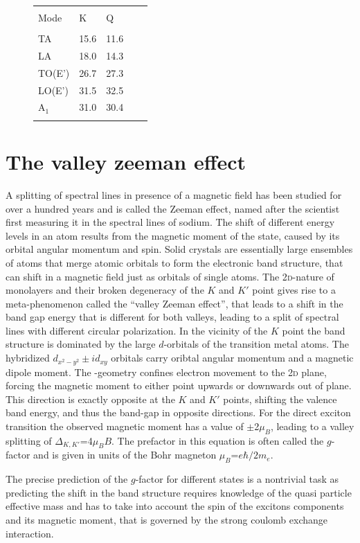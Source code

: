 \begin{figure}[t]
\centering
\begin{tabular}{lllll}
\hline
\hline\\
Mode&K&Q\\
\hline\\
TA&15.6&11.6\\
LA&18.0&14.3\\
TO(E')&26.7&27.3\\
LO(E')&31.5&32.5\\
A$_1$&31.0&30.4\\
\\\hline


\end{tabular}
\caption{\cite{jin_intrinsic_2014}}\label{phonons}
\end{figure}
\cite{van_der_donck_excitons_2018} 

\section{The valley zeeman effect}\label{zeeman}

A splitting of spectral lines in presence of a magnetic field has been studied for over a hundred years and is called the Zeeman effect, named after the scientist first measuring it in the spectral lines of sodium. The shift of different energy levels in an atom results from the magnetic moment of the state, caused by its orbital angular momentum and spin. Solid crystals are essentially large ensembles of atoms that merge atomic orbitals to form the electronic band structure, that can shift in a magnetic field just as orbitals of single atoms. The 2\textsc{d}-nature of \tmdg monolayers and their broken degeneracy of the $K$ and $K'$ point gives rise to a meta-phenomenon called  the ``valley Zeeman effect'', that leads to a shift in the band gap energy that is different for both valleys, leading to a split of spectral lines with different circular polarization\cite{srivastava_valley_2015}. In the vicinity of the $K$ point the band structure is dominated by the large $d$-orbitals of the transition metal atoms. The hybridized $d_{x^2-y^2} \pm id_{xy}$ orbitals carry oribtal angular momentum and a magnetic dipole moment. The \tmd-geometry confines electron movement to the 2\textsc{d} plane, forcing the magnetic moment to either point upwards or downwards out of plane. This direction is exactly opposite at the $K$ and $K'$ points, shifting the valence band energy, and thus the band-gap in opposite directions. For the direct exciton transition the observed magnetic moment has a value of $\pm$2$\mu_B$, leading to a valley splitting of $\Delta_{K,K'}$=4$\mu_BB$. The prefactor in this equation is often called the $g$-factor and is given in units of the Bohr magneton $\mu_B$=$e\hbar/2m_e$.

The precise prediction of the $g$-factor for different states is a nontrivial task as predicting the shift in the band structure requires knowledge of the quasi particle effective mass and has to take into account the spin of the excitons components and its magnetic moment, that is governed by the strong coulomb exchange interaction. \cite{rybkovskiy_atomically_2017}